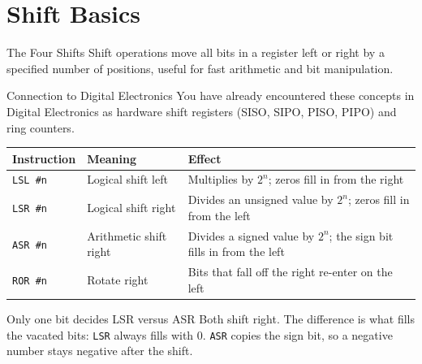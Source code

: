 \documentclass[9pt,aspectratio=169,xcolor=table]{beamer}
\newcommand{\striped}{\rowcolors{1}{white}{stripe}}
\begin{document}
\section{Shift Basics}

\begin{frame}{The Four Shifts}
	\leavevmode
	{\small Shift operations move all bits in a register left or right by a specified number of positions, useful for fast arithmetic and bit manipulation.}

	\vspace{2mm}
	\begin{block}{Connection to Digital Electronics}
		{\small You have already encountered these concepts in Digital Electronics as hardware shift registers (SISO, SIPO, PISO, PIPO) and ring counters.}
	\end{block}

	\vspace{2mm}
	\begin{center}
		{\small
			\striped
			\begin{tabular}{@{}l l R{.6\textwidth}@{}}
				\toprule
				\textbf{Instruction} & \textbf{Meaning} & \textbf{Effect} \\
				\midrule
				\texttt{LSL \#n} & Logical shift left   & Multiplies by $2^n$; zeros fill in from the right \\
				\texttt{LSR \#n} & Logical shift right  & Divides an \alert{unsigned} value by $2^n$; zeros fill in from the left \\
				\texttt{ASR \#n} & Arithmetic shift right & Divides a \alert{signed} value by $2^n$; the sign bit fills in from the left \\
				\texttt{ROR \#n} & Rotate right        & Bits that fall off the right re-enter on the left \\
				\bottomrule
		\end{tabular}}
	\end{center}

	\vspace{2mm}
	\begin{block}{Only one bit decides LSR versus ASR}
		{\small Both shift right. The difference is what fills the vacated
			bits: \texttt{LSR} always fills with \alert{0}. \texttt{ASR}
			copies the \alert{sign bit}, so a negative number stays
			negative after the shift.}
	\end{block}
\end{frame}
\end{document}
